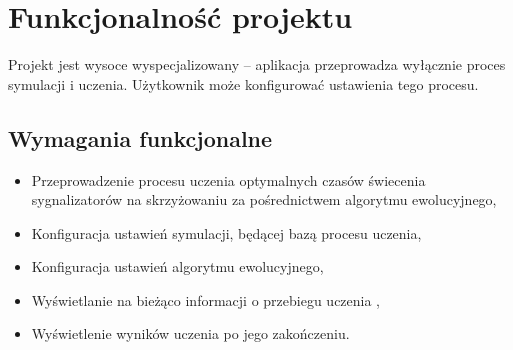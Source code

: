 \chapter*{Funkcjonalność projektu}
Projekt jest wysoce wyspecjalizowany -- aplikacja przeprowadza wyłącznie proces symulacji i uczenia. Użytkownik może konfigurować ustawienia tego procesu.
\section*{Wymagania funkcjonalne}
\begin{itemize}
	\item Przeprowadzenie procesu uczenia optymalnych czasów świecenia sygnalizatorów na skrzyżowaniu za pośrednictwem algorytmu ewolucyjnego,
	\item Konfiguracja ustawień symulacji, będącej bazą procesu uczenia,
	\item Konfiguracja ustawień algorytmu ewolucyjnego,
	\item Wyświetlanie na bieżąco informacji o przebiegu uczenia ,
	\item Wyświetlenie wyników uczenia po jego zakończeniu.
\end{itemize}
